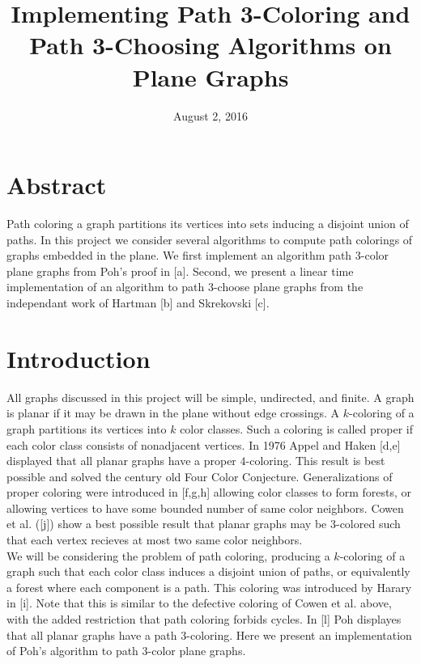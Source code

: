 \documentclass[11pt,letter]{article}
\begin{document}
\title{Implementing Path 3-Coloring and Path 3-Choosing Algorithms on Plane Graphs}
\date{August 2, 2016}

\maketitle

\section*{Abstract}

Path coloring a graph partitions its vertices into sets inducing a disjoint union of paths. In this project
we consider several algorithms to compute path colorings of graphs embedded in the plane. We
first implement an algorithm path 3-color plane graphs from Poh's proof in [a]. Second, we present a linear time
implementation of an algorithm to path 3-choose plane graphs from the independant work of Hartman [b] and
Skrekovski [c].

\section{Introduction}

All graphs discussed in this project will be simple, undirected, and finite. A graph is planar if it may
be drawn in the plane without edge crossings. A $k$-coloring of a graph partitions
its vertices into $k$ color classes. Such a coloring is called proper if each color class consists of
nonadjacent vertices. In 1976 Appel and Haken [d,e] displayed that all planar graphs have a proper $4$-coloring.
This result is best possible and solved the century old Four Color Conjecture.
Generalizations of proper coloring were introduced in [f,g,h] allowing color classes to form forests, or allowing vertices
to have some bounded number of same color neighbors. Cowen et al. ([j]) show a best possible result that planar
graphs may be $3$-colored such that each vertex recieves at most two same color neighbors.\\

\noindent We will be considering the problem of path coloring, producing a $k$-coloring of a graph such that each color
class induces a disjoint union of paths, or equivalently a forest where each component is a path. This coloring
was introduced by Harary in [i]. Note that this is similar to the defective coloring of Cowen et al. above,
with the added restriction that path coloring forbids cycles. In [l] Poh displayes that all
planar graphs have a path $3$-coloring. Here we present an implementation of Poh's algorithm to path
$3$-color plane graphs.\\
\end{document}

